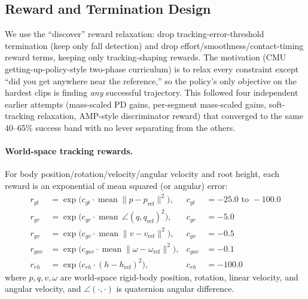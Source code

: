 \subsection{Reward and Termination Design}
\label{sec:method:reward}

We use the ``discover'' reward relaxation: drop tracking-error-threshold termination (keep only
fall detection) and drop effort/smoothness/contact-timing reward terms, keeping only
tracking-shaping rewards. The motivation (CMU getting-up-policy-style two-phase curriculum) is to
relax every constraint except ``did you get anywhere near the reference,'' so the policy's only
objective on the hardest clips is finding \emph{any} successful trajectory. This followed four
independent earlier attempts (mass-scaled PD gains, per-segment mass-scaled gains, soft-tracking
relaxation, AMP-style discriminator reward) that converged to the same 40--65\% success band with
no lever separating from the others.

\paragraph{World-space tracking rewards.} For body position/rotation/velocity/angular velocity and
root height, each reward is an exponential of mean squared (or angular) error:
\begin{align}
  r_{gt} &= \exp\!\big(c_{gt} \cdot \operatorname{mean}\|p - p_{\text{ref}}\|^2\big), & c_{gt} &= -25.0 \text{ to } -100.0 \\
  r_{gr} &= \exp\!\big(c_{gr} \cdot \operatorname{mean}\, \angle(q, q_{\text{ref}})^2\big), & c_{gr} &= -5.0 \\
  r_{gv} &= \exp\!\big(c_{gv} \cdot \operatorname{mean}\|v - v_{\text{ref}}\|^2\big), & c_{gv} &= -0.5 \\
  r_{gav} &= \exp\!\big(c_{gav} \cdot \operatorname{mean}\|\omega - \omega_{\text{ref}}\|^2\big), & c_{gav} &= -0.1 \\
  r_{rh} &= \exp\!\big(c_{rh} \cdot (h - h_{\text{ref}})^2\big), & c_{rh} &= -100.0
\end{align}
where $p, q, v, \omega$ are world-space rigid-body position, rotation, linear velocity, and
angular velocity, and $\angle(\cdot,\cdot)$ is quaternion angular difference.


